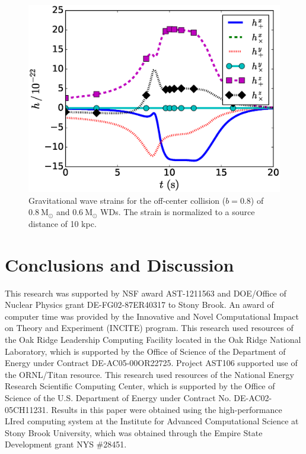 \documentclass[twocolumn,numberedappendix]{../aastex6}
\newcommand{\msolar}{\mathrm{M}_\odot}
\begin{document}
\begin{figure}
  \centering
  \includegraphics[scale=0.425]{plots/gw_signal_3D}
  \caption{Gravitational wave strains for the off-center collision ($b = 0.8$) of
           $0.8\ \msolar$ and $0.6\ \msolar$ WDs. The strain is normalized to a
           source distance of 10 kpc.
           \label{fig:gw_signal_3D}}
\end{figure}



\section{Conclusions and Discussion}\label{Sec:Conclusions and Discussion}
\label{sec:conclusion}



\acknowledgments

This research was supported by NSF award AST-1211563 and DOE/Office of
Nuclear Physics grant DE-FG02-87ER40317 to Stony Brook. An award of
computer time was provided by the Innovative and Novel Computational
Impact on Theory and Experiment (INCITE) program.  This research used
resources of the Oak Ridge Leadership Computing Facility located in
the Oak Ridge National Laboratory, which is supported by the Office of
Science of the Department of Energy under Contract
DE-AC05-00OR22725. Project AST106 supported use of the ORNL/Titan
resource.  This research used resources of the National Energy
Research Scientific Computing Center, which is supported by the Office
of Science of the U.S. Department of Energy under Contract
No. DE-AC02-05CH11231.  Results in this paper were obtained using the
high-performance LIred computing system at the Institute for Advanced
Computational Science at Stony Brook University, which was obtained
through the Empire State Development grant NYS \#28451.
\end{document}
